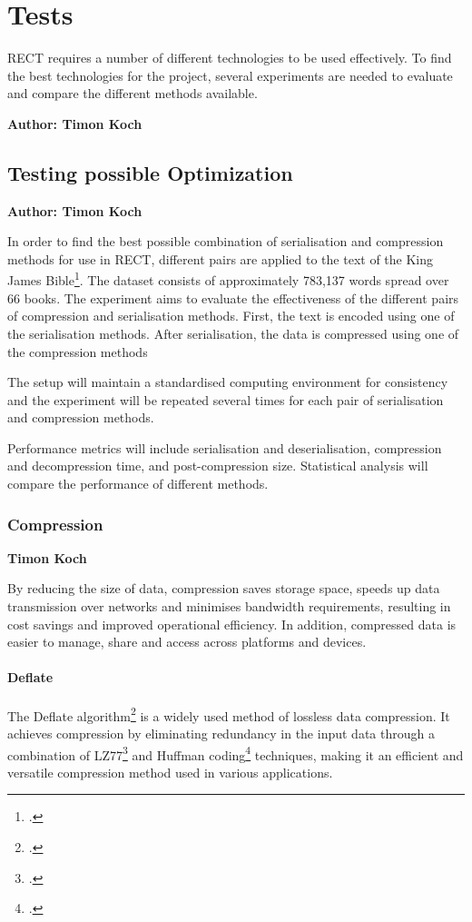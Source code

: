 \chapter{Tests}

RECT requires a number of different technologies to be used effectively. To find the best technologies for the project, several experiments are needed to evaluate and compare the different methods available. 

\textbf{Author: Timon Koch}

\section{Testing possible Optimization}
\textbf{Author: Timon Koch}

In order to find the best possible combination of serialisation and compression methods for use in RECT, different pairs are applied to the text of the King James Bible\footcite{king_james_bible}. The dataset consists of approximately 783,137 words spread over 66 books. The experiment aims to evaluate the effectiveness of the different pairs of compression and serialisation methods. First, the text is encoded using one of the serialisation methods. After serialisation, the data is compressed using one of the compression methods

The setup will maintain a standardised computing environment for consistency and the experiment will be repeated several times for each pair of serialisation and compression methods.

Performance metrics will include serialisation and deserialisation, compression and decompression time, and post-compression size. Statistical analysis will compare the performance of different methods.

\subsection{Compression}
\textbf{Timon Koch}

By reducing the size of data, compression saves storage space, speeds up data transmission over networks and minimises bandwidth requirements, resulting in cost savings and improved operational efficiency. In addition, compressed data is easier to manage, share and access across platforms and devices. 

\subsubsection{Deflate}
The Deflate algorithm\footcite{deflate} is a widely used method of lossless data compression. It achieves compression by eliminating redundancy in the input data through a combination of LZ77\footcite{lz77} and Huffman coding\footcite{huffman_coding} techniques, making it an efficient and versatile compression method used in various applications.

